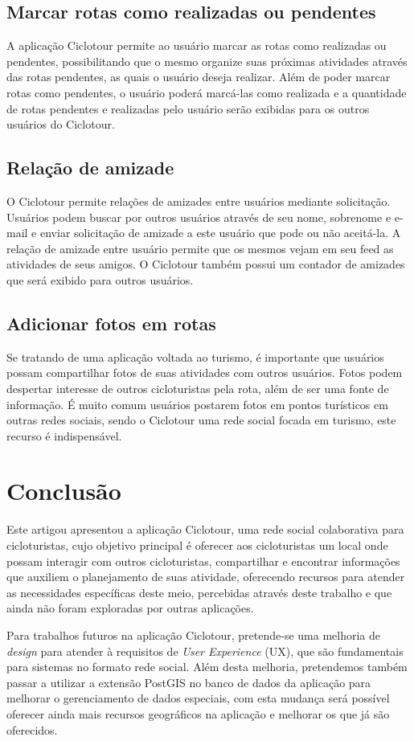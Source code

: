 \subsection{Marcar rotas como realizadas ou pendentes}
A aplicação Ciclotour permite ao usuário marcar as rotas como realizadas ou pendentes, possibilitando que o mesmo organize suas próximas atividades
através das rotas pendentes, as quais o usuário deseja realizar. Além de poder marcar rotas como pendentes, o usuário poderá marcá-las como realizada
e a quantidade de rotas pendentes e realizadas pelo usuário serão exibidas para os outros usuários do Ciclotour.

\subsection{Relação de amizade}
O Ciclotour permite relações de amizades entre usuários mediante solicitação. Usuários podem buscar por outros usuários através de seu nome, 
sobrenome e e-mail e enviar solicitação de amizade a este usuário que pode ou não aceitá-la. A relação de amizade entre usuário permite que os mesmos
vejam em seu feed as atividades de seus amigos. O Ciclotour também possui um contador de amizades que será exibido para outros usuários.

\subsection{Adicionar fotos em rotas}
Se tratando de uma aplicação voltada ao turismo, é importante que usuários possam compartilhar fotos de suas atividades com outros usuários. Fotos 
podem despertar interesse de outros cicloturistas pela rota, além de ser uma fonte de informação. É muito comum usuários postarem fotos em pontos 
turísticos em outras redes sociais, sendo o Ciclotour uma rede social focada em turismo, este recurso é indispensável.

\section{Conclusão}
Este artigou apresentou a aplicação Ciclotour, uma rede social colaborativa para cicloturistas, cujo objetivo principal é oferecer aos cicloturistas 
um local onde possam interagir com outros cicloturistas, compartilhar e encontrar informações que auxiliem o planejamento de suas atividade, 
oferecendo recursos para atender as necessidades específicas deste meio, percebidas através deste trabalho e que ainda não foram exploradas por 
outras aplicações.

Para trabalhos futuros na aplicação Ciclotour, pretende-se uma melhoria de \textit{design} para atender à requisitos de \textit{User Experience} (UX),
que são fundamentais para sistemas no formato rede social. Além desta melhoria, pretendemos também passar a utilizar a extensão PostGIS no banco de 
dados da aplicação para melhorar o gerenciamento de dados especiais, com esta mudança será possível oferecer ainda mais recursos geográficos na 
aplicação e melhorar os que já são oferecidos.




